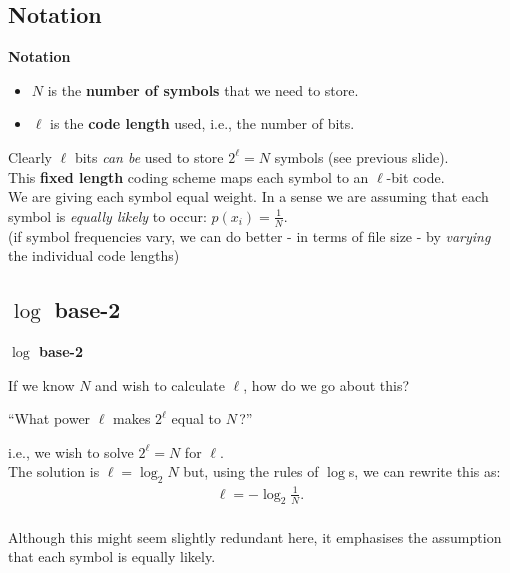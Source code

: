\documentclass[compress]{beamer}        %
\makeatletter
\newcommand{\tcb}{\textcolor{beamer@blendedblue}}
\makeatother
\begin{document}
\subsection{Notation}
\begin{frame}{\bf \tcb{Notation}}

\begin{itemize}\itemsep0.7cm
\item {\boldmath$N$} is the {\bf number of symbols} that we need to store.
\item {\boldmath$\ell$} is the {\bf code length} used, i.e., the number of bits.\\[0.8cm]
\end{itemize}

Clearly $\ell$ bits \emph{can be} used to store $2^\ell = N$ symbols (see previous slide).\\[0.5cm]

This {\bf fixed length} coding scheme maps each symbol to an $\ell$-bit code.\\[0.5cm]

We are giving each symbol equal weight. In a sense we are assuming that each symbol is \emph{equally likely} to occur: $p(x_i) = \frac{1}{N}$.\\[0.8cm]
{\footnotesize(if symbol frequencies vary, we can do better - in terms of file size - by \emph{varying} the individual code lengths)}

\end{frame}




\subsection{$\log$ base-2}
\begin{frame}{\bf \tcb{$\log$ base-2}}

If we know $N$ and wish to calculate $\ell$, how do we go about this?\\[0.4cm]
\begin{center}
``What power $\ell$ makes $2^\ell$ equal to $N$\,?''\\[-0.1cm]
\end{center}
i.e., we wish to solve $2^{\ell} = N$ for $\ell$.\\[0.8cm]

The solution is $\ell = \log_2 N$ but, using the rules of $\log$s, we can rewrite this as:\\[-0.5cm]
\begin{align*}
\ell =  - \log_2 \tfrac{1}{N}.\\[-0.3cm]
\end{align*}

Although this might seem slightly redundant here, it emphasises the assumption that each symbol is equally likely.

\end{frame}
\end{document}

